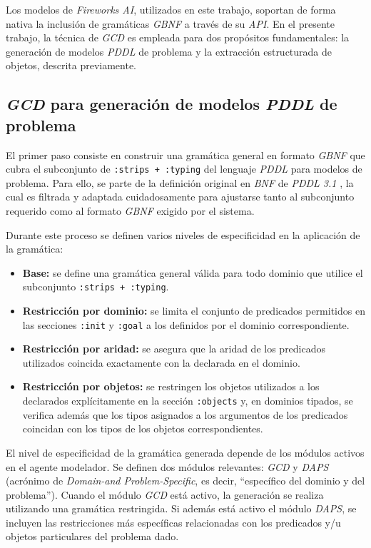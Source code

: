 Los modelos de \textit{Fireworks AI}, utilizados en este trabajo, soportan de forma nativa la inclusión de gramáticas \textit{GBNF} a través de su \textit{API}. En el presente trabajo, la técnica de \textit{GCD} es empleada para dos propósitos fundamentales: la generación de modelos \textit{PDDL} de problema y la extracción estructurada de objetos, descrita previamente.

\subsection{\textit{GCD} para generación de modelos \textit{PDDL} de problema}

El primer paso consiste en construir una gramática general en formato \textit{GBNF} que cubra el subconjunto de \texttt{:strips + :typing} del lenguaje \textit{PDDL} para modelos de problema. Para ello, se parte de la definición original en \textit{BNF} de \textit{PDDL 3.1} \parencite{kovacs2011bnf}, la cual es filtrada y adaptada cuidadosamente para ajustarse tanto al subconjunto requerido como al formato \textit{GBNF} exigido por el sistema.

Durante este proceso se definen varios niveles de especificidad en la aplicación de la gramática:

\begin{itemize}
    \item \textbf{Base:} se define una gramática general válida para todo dominio que utilice el subconjunto \texttt{:strips + :typing}.
    \item \textbf{Restricción por dominio:} se limita el conjunto de predicados permitidos en las secciones \texttt{:init} y \texttt{:goal} a los definidos por el dominio correspondiente.
    \item \textbf{Restricción por aridad:} se asegura que la aridad de los predicados utilizados coincida exactamente con la declarada en el dominio.
    \item \textbf{Restricción por objetos:} se restringen los objetos utilizados a los declarados explícitamente en la sección \texttt{:objects} y, en dominios tipados, se verifica además que los tipos asignados a los argumentos de los predicados coincidan con los tipos de los objetos correspondientes.
\end{itemize}

El nivel de especificidad de la gramática generada depende de los módulos activos en el agente modelador. Se definen dos módulos relevantes: \textit{GCD} y \textit{DAPS} (acrónimo de \textit{Domain-and Problem-Specific}, es decir, ``específico del dominio y del problema''). Cuando el módulo \textit{GCD} está activo, la generación se realiza utilizando una gramática restringida. Si además está activo el módulo \textit{DAPS}, se incluyen las restricciones más específicas relacionadas con los predicados y/u objetos particulares del problema dado.


